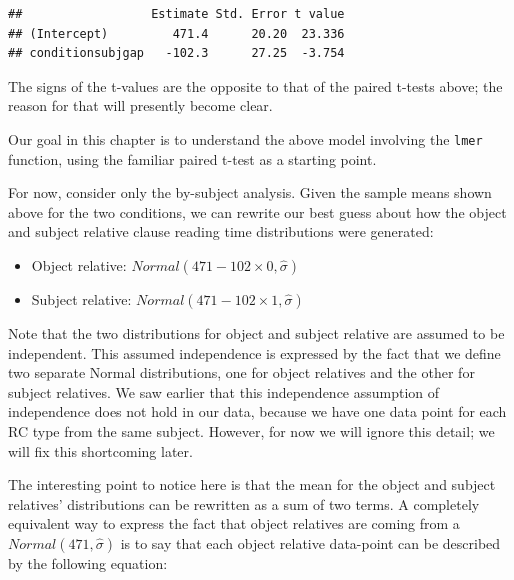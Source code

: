 \documentclass[12pt,]{krantz}
\newenvironment{Shaded}{\begin{snugshade}}{\end{snugshade}}
\newcommand{\DecValTok}[1]{\textcolor[rgb]{0.00,0.00,0.81}{#1}}
\newcommand{\KeywordTok}[1]{\textcolor[rgb]{0.13,0.29,0.53}{\textbf{#1}}}
\newcommand{\NormalTok}[1]{#1}
\newcommand{\OperatorTok}[1]{\textcolor[rgb]{0.81,0.36,0.00}{\textbf{#1}}}
\newcommand{\StringTok}[1]{\textcolor[rgb]{0.31,0.60,0.02}{#1}}
\providecommand{\tightlist}{%
  \setlength{\itemsep}{0pt}\setlength{\parskip}{0pt}}
\begin{document}
\begin{Shaded}
\end{Shaded}

\begin{verbatim}
##                  Estimate Std. Error t value
## (Intercept)         471.4      20.20  23.336
## conditionsubjgap   -102.3      27.25  -3.754
\end{verbatim}

The signs of the t-values are the opposite to that of the paired t-tests above; the reason for that will presently become clear.

Our goal in this chapter is to understand the above model involving the \texttt{lmer} function, using the familiar paired t-test as a starting point.

For now, consider only the by-subject analysis.
Given the sample means shown above for the two conditions,
we can rewrite our best guess about how the object and subject relative clause reading time distributions were generated:

\begin{itemize}
\tightlist
\item
  Object relative: \(Normal(471 - 102 \times 0,\hat\sigma)\)
\item
  Subject relative: \(Normal(471-102 \times 1,\hat\sigma)\)
\end{itemize}

Note that the two distributions for object and subject relative are assumed to be independent. This assumed independence is expressed by the fact that we define two separate Normal distributions, one for object relatives and the other for subject relatives. We saw earlier that this independence assumption of independence does not hold in our data, because we have one data point for each RC type from the same subject. However, for now we will ignore this detail; we will fix this shortcoming later.

The interesting point to notice here is that the mean for the object and subject relatives' distributions can be rewritten as a sum of two terms. A completely equivalent way to express the fact that object relatives are coming from a \(Normal(471,\hat\sigma)\) is to say that each object relative data-point can be described by the following equation:
\end{document}
